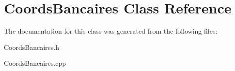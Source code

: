 \section{Coords\-Bancaires Class Reference}
\label{class_coords_bancaires}


The documentation for this class was generated from the following files\-:\begin{DoxyCompactItemize}
\item 
Coords\-Bancaires.\-h\item 
Coords\-Bancaires.\-cpp\end{DoxyCompactItemize}
